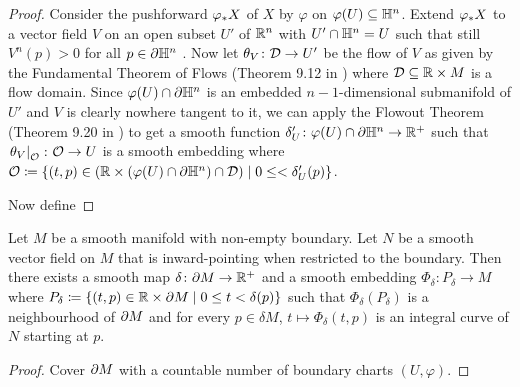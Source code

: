 \begin{proof}
    Consider the pushforward $\varphi_*X$ of $X$ by $\varphi$ on $\varphi (U) \subseteq \mathbb{H}^n$. 
    Extend $\varphi_*X$ to a vector field $V$ on an open subset $U'$ of $\mathbb{R}^n$ with $U' \cap \mathbb{H}^n = U$ such that still $V^n (p) > 0$ for all $p \in \partial \mathbb{H}^n$ .
    Now let $\theta_V \colon \mathcal{D} \to U'$ be the flow of $V$ as given by the Fundamental Theorem of Flows (Theorem 9.12 in \cite{Lee2006}) where $\mathcal{D} \subseteq \mathbb{R} \times M$ is a flow domain. 
    Since $\varphi (U) \cap \partial \mathbb{H}^n$ is an embedded $n-1$-dimensional submanifold of $U'$ and $V$ is clearly nowhere tangent to it, we can apply the Flowout Theorem (Theorem 9.20 in \cite{Lee2006}) to get a smooth function $\delta_U' \colon \varphi (U) \cap \partial \mathbb{H}^n \to \mathbb{R}^+$ such that $\left.\theta_V\right|_{\mathcal{O}} \colon \mathcal{O} \to U$ is a smooth embedding where $\mathcal{O} \coloneqq \{ (t, p) \in (\mathbb{R} \times (\varphi (U) \cap \partial \mathbb{H}^n) \cap \mathcal{D}) \mid 0 \le < \delta_U' (p)\}$. 

    Now define 
\end{proof}

\begin{lem}
    Let $M$ be a smooth manifold with non-empty boundary. 
    Let $N$ be a smooth vector field on $M$ that is inward-pointing when restricted to the boundary. 
    Then there exists a smooth map $\delta \colon \partial M \to \mathbb{R}^+$ and a smooth embedding $\Phi_\delta \colon P_\delta \to M$ where $P_\delta \coloneqq \{(t, p) \in \mathbb{R} \times \partial M \mid 0 \leq t < \delta (p)\}$ such that $\Phi_\delta (P_\delta)$ is a neighbourhood of $\partial M$ and for every $p \in \delta M$, $t \mapsto \Phi_\delta (t, p)$ is an integral curve of $N$ starting at $p$. 
\end{lem}

\begin{proof}
    Cover $\partial M$ with a countable number of boundary charts $(U, \varphi)$. 
\end{proof}